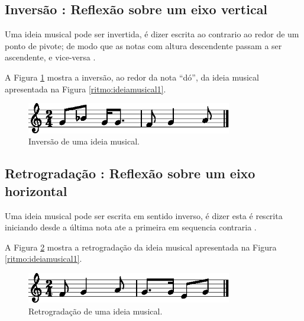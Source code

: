 \subsection{Inversão : Reflexão sobre um eixo vertical}
\label{subsec:inversaovertical}

Uma ideia musical pode ser invertida, é dizer escrita ao contrario ao redor de um ponto de pivote;
de modo que as notas com altura descendente passam a ser ascendente, e vice-versa
\cite[pp. 30]{bennett1993elementos}.

A Figura \ref{ritmo:invert-ex1} mostra a inversão, ao redor da nota ``dó'', 
da ideia musical apresentada na Figura \ref{ritmo:ideiamusical1}.
\begin{figure}[H]
\centering
    \includegraphics[width=0.8\textwidth]{chapters/cap-musica-composer/invert-ex1-1.eps}
\caption{Inversão de uma ideia musical.}
\label{ritmo:invert-ex1}
\end{figure}


\subsection{Retrogradação : Reflexão sobre um eixo horizontal}

Uma ideia musical pode ser escrita em sentido inverso, 
é dizer esta é rescrita iniciando desde a última nota ate a primeira em sequencia contraria 
\cite[pp. 77]{arbones2012armonia}.

A Figura \ref{ritmo:retrogrado-ex1} mostra a retrogradação
da ideia musical apresentada na Figura \ref{ritmo:ideiamusical1}.
\begin{figure}[H]
\centering
    \includegraphics[width=0.8\textwidth]{chapters/cap-musica-composer/retrogrado-ex1-1.eps}
\caption{Retrogradação de uma ideia musical.}
\label{ritmo:retrogrado-ex1}
\end{figure}



